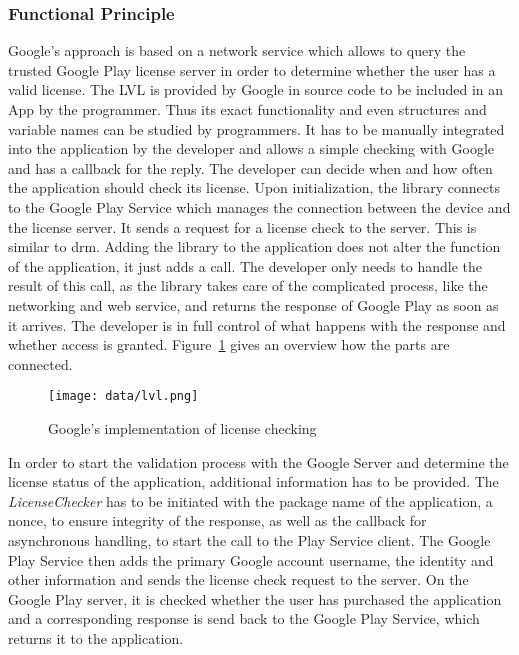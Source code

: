 \subsubsection{Functional Principle} \label{section:license-google-functional}
Google's approach is based on a network service which allows to query the trusted Google Play license server in order to determine whether the user has a valid license.
The LVL is provided by Google in source code to be included in an App by the programmer. Thus its exact functionality and even structures and variable names can be studied by programmers. \cite{munteanLicense}
\newline
It has to be manually integrated into the application by the developer and allows a simple checking with Google and has a callback for the reply.
The developer can decide when and how often the application should check its license.
Upon initialization, the library connects to the Google Play Service which manages the connection between the device and the license server.
It sends a request for a license check to the server.
This is similar to \gls{drm}.
Adding the library to the application does not alter the function of the application, it just adds a call.
The developer only needs to handle the result of this call, as the library takes care of the complicated process, like the networking and web service, and returns the response of Google Play as soon as it arrives.
The developer is in full control of what happens with the response and whether access is granted.
Figure~\ref{fig:lvl} gives an overview how the parts are connected. \cite{digipomLvl} \cite{developersLicensingOverview}
\newline
\begin{figure}[h]
    \centering
    \texttt{[image: data/lvl.png]}
    \caption{Google's implementation of license checking \cite{developersLicensingOverview}}
    \label{fig:lvl}
\end{figure}
In order to start the validation process with the Google Server and determine the license status of the application, additional information has to be provided.
The \textit{LicenseChecker} has to be initiated with the package name of the application, a nonce, to ensure integrity of the response, as well as the callback for asynchronous handling, to start the call to the Play Service client.
The Google Play Service then adds the primary Google account username, the identity and other information and sends the license check request to the server.
On the Google Play server, it is checked whether the user has purchased the application and a corresponding response is send back to the Google Play Service, which returns it to the application. \cite{developersLicensingOverview}

